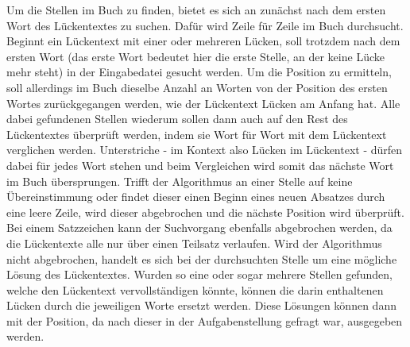 \documentclass[a4paper,10pt,ngerman]{scrartcl}
\begin{document}
		Um die Stellen im Buch zu finden, bietet es sich an zunächst nach dem ersten Wort des Lückentextes zu suchen.
		Dafür wird Zeile für Zeile im Buch durchsucht.
		Beginnt ein Lückentext mit einer oder mehreren Lücken, soll trotzdem nach dem ersten Wort (das erste Wort bedeutet hier die erste Stelle, an der keine Lücke mehr steht) in der Eingabedatei gesucht werden.
		Um die Position zu ermitteln, soll allerdings im Buch dieselbe Anzahl an Worten von der Position des ersten Wortes zurückgegangen werden, wie der Lückentext Lücken am Anfang hat.
		Alle dabei gefundenen Stellen wiederum sollen dann auch auf den Rest des Lückentextes überprüft werden, indem sie Wort für Wort mit dem Lückentext verglichen werden.
		Unterstriche - im Kontext also Lücken im Lückentext - dürfen dabei für jedes Wort stehen und beim Vergleichen wird somit das nächste Wort im Buch übersprungen.
		Trifft der Algorithmus an einer Stelle auf keine Übereinstimmung oder findet dieser einen Beginn eines neuen Absatzes durch eine leere Zeile, wird dieser abgebrochen und die nächste Position wird überprüft.
		Bei einem Satzzeichen kann der Suchvorgang ebenfalls abgebrochen werden, da die Lückentexte alle nur über einen Teilsatz verlaufen.
		Wird der Algorithmus nicht abgebrochen, handelt es sich bei der durchsuchten Stelle um eine mögliche Lösung des Lückentextes.
		Wurden so eine oder sogar mehrere Stellen gefunden, welche den Lückentext vervollständigen könnte, können die darin enthaltenen Lücken durch die jeweiligen Worte ersetzt werden.
		Diese Lösungen können dann mit der Position, da nach dieser in der Aufgabenstellung gefragt war, ausgegeben werden.
\end{document}
